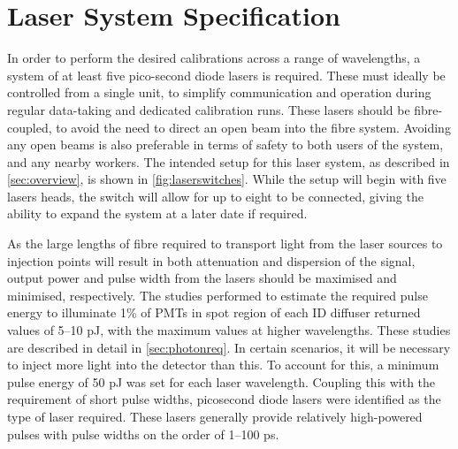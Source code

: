\documentclass[a4paper,11pt]{article}
\providecommand{\DIFaddtex}[1]{{\protect\color{blue}\uwave{#1}}} %
\providecommand{\DIFaddbegin}{} %
\providecommand{\DIFaddend}{} %
\providecommand{\DIFadd}[1]{\texorpdfstring{\DIFaddtex{#1}}{#1}} %
\newcommand{\DIFaddincludegraphics}[2][]{{\color{blue}\fbox{\DIFOincludegraphics[#1]{#2}}}} %
\DeclareRobustCommand{\DIFaddbegin}{\DIFOaddbegin \let\includegraphics\DIFaddincludegraphics} %
\DeclareRobustCommand{\DIFaddend}{\DIFOaddend \let\includegraphics\DIFOincludegraphics} %
\begin{document}
\DIFaddend \section{Laser System Specification}\label{sec:laser}
In order to perform the desired calibrations across a range of wavelengths, a system of at least five pico-second diode lasers is required. These must ideally be controlled from a single unit, to simplify communication and operation during regular data-taking and dedicated calibration runs. These lasers should be fibre-coupled, to avoid the need to direct an open beam into the fibre system. Avoiding any open beams is also preferable in terms of safety to both users of the system, and any nearby workers. The intended setup for this laser system, as described in \cref{sec:overview}, is shown in \cref{fig:laserswitches}. While the setup will begin with five lasers heads, the switch will allow for up to eight to be connected, giving the ability to expand the system at a later date if required.

As the large lengths of fibre required to transport light from the laser sources to injection points will result in both attenuation and dispersion of the signal, output power and pulse width from the lasers should be maximised and minimised, respectively. The studies performed to estimate the required pulse energy to illuminate 1\% of PMTs in spot region of each ID diffuser returned values of 5--10 pJ, with the maximum values at higher wavelengths. These studies are described in detail in \cref{sec:photonreq}. In certain scenarios, it will be necessary to inject more light into the detector than this. To account for this, a minimum pulse energy of 50 pJ was set for each laser wavelength\DIFaddbegin \DIFadd{, though more is of course better}\DIFaddend . Coupling this with the requirement of short pulse widths, picosecond diode lasers were identified as the type of laser required. These lasers generally provide relatively high-powered pulses with pulse widths on the order of 1--100 ps.
\end{document}
